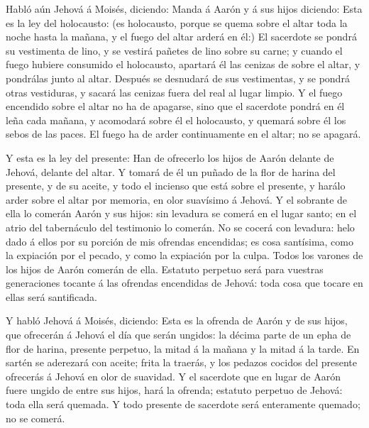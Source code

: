  Habló aún Jehová á Moisés, diciendo:  Manda á
Aarón y á sus hijos diciendo: Esta es la ley del holocausto: (es
holocausto, porque se quema sobre el altar toda la noche hasta la
mañana, y el fuego del altar arderá en él:)  El sacerdote
se pondrá su vestimenta de lino, y se vestirá pañetes de lino sobre su
carne; y cuando el fuego hubiere consumido el holocausto, apartará él
las cenizas de sobre el altar, y pondrálas junto al altar. 
Después se desnudará de sus vestimentas, y se pondrá otras vestiduras, y
sacará las cenizas fuera del real al lugar limpio.  Y el
fuego encendido sobre el altar no ha de apagarse, sino que el sacerdote
pondrá en él leña cada mañana, y acomodará sobre él el holocausto, y
quemará sobre él los sebos de las paces.  El fuego ha de
arder continuamente en el altar; no se apagará.

 Y esta es la ley del presente: Han de ofrecerlo los hijos
de Aarón delante de Jehová, delante del altar.  Y tomará de
él un puñado de la flor de harina del presente, y de su aceite, y todo
el incienso que está sobre el presente, y harálo arder sobre el altar
por memoria, en olor suavísimo á Jehová.  Y el sobrante de
ella lo comerán Aarón y sus hijos: sin levadura se comerá en el lugar
santo; en el atrio del tabernáculo del testimonio lo comerán.
 No se cocerá con levadura: helo dado á ellos por su
porción de mis ofrendas encendidas; es cosa santísima, como la expiación
por el pecado, y como la expiación por la culpa.  Todos los
varones de los hijos de Aarón comerán de ella. Estatuto perpetuo será
para vuestras generaciones tocante á las ofrendas encendidas de Jehová:
toda cosa que tocare en ellas será santificada.

 Y habló Jehová á Moisés, diciendo:  Esta es
la ofrenda de Aarón y de sus hijos, que ofrecerán á Jehová el día que
serán ungidos: la décima parte de un epha de flor de harina, presente
perpetuo, la mitad á la mañana y la mitad á la tarde.  En
sartén se aderezará con aceite; frita la traerás, y los pedazos cocidos
del presente ofrecerás á Jehová en olor de suavidad.  Y el
sacerdote que en lugar de Aarón fuere ungido de entre sus hijos, hará la
ofrenda; estatuto perpetuo de Jehová: toda ella será quemada.
 Y todo presente de sacerdote será enteramente quemado; no
se comerá.

